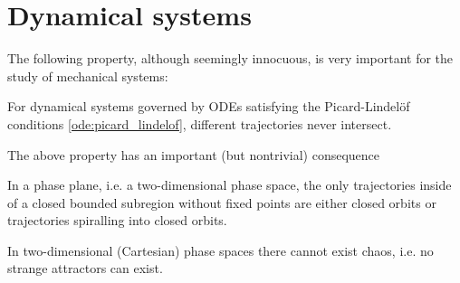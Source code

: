 \section{Dynamical systems}

    The following property, although seemingly innocuous, is very important for the study of mechanical systems:
    \begin{property}
        For dynamical systems governed by ODEs satisfying the Picard-Lindel\"of conditions \ref{ode:picard_lindelof}, different trajectories never intersect.
    \end{property}

    The above property has an important (but nontrivial) consequence
    \begin{theorem}
        In a phase plane, i.e. a two-dimensional phase space, the only trajectories inside of a closed bounded subregion without fixed points are either closed orbits or trajectories spiralling into closed orbits.
    \end{theorem}
    \begin{result}
        In two-dimensional (Cartesian) phase spaces there cannot exist chaos, i.e. no strange attractors can exist.
    \end{result}



